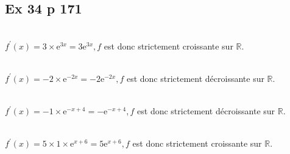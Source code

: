 \documentclass[12pt,a4paper]{book}
\begin{document}
\subsection*{Ex 34 p 171}
\begin{enumMet}
	\item {}\\
	$f^{\prime}(x)=3 \times \mathrm{e}^{3 x}=3 \mathrm{e}^{3 x}, f$ est donc strictement croissante sur $\mathbb{R}$.
	\item {}\\
	$f^{\prime}(x)=-2 \times \mathrm{e}^{-2 x}=-2 \mathrm{e}^{-2 x}, f$ est donc strictement décroissante sur $\mathbb{R}$.
	\item {}\\
	$f^{\prime}(x)=-1 \times \mathrm{e}^{-x+4}=-\mathrm{e}^{-x+4}, f$ est donc strictement décroissante sur $\mathbb{R}$.
	\item {}\\
	$f^{\prime}(x)=5 \times 1 \times \mathrm{e}^{x+6}=5 \mathrm{e}^{x+6}, f$ est donc strictement croissante sur $\mathbb{R}$.
\end{enumMet}

%
\end{document}
